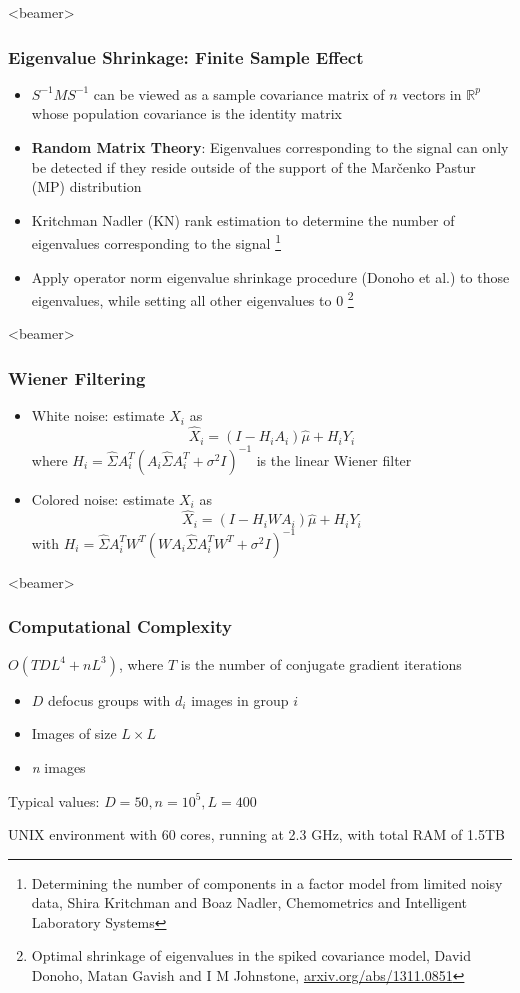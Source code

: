 \documentclass{beamer}
\begin{document}
\begin{frame}<beamer>
\frametitle{Eigenvalue Shrinkage:  Finite Sample Effect}
\begin{itemize}
\item $S^{-1}MS^{-1}$ can be viewed as a sample covariance matrix of
$n$ vectors in $ \mathbb{R}^p$ whose population covariance is the identity matrix
\item \textbf{Random Matrix Theory}: Eigenvalues corresponding to the signal 
can only be detected if they reside outside of the support of the  Mar\v{c}enko Pastur (MP)
distribution
\item Kritchman Nadler (KN) rank estimation to determine the number of eigenvalues 
corresponding to the signal \footnote{\tiny{Determining the number of components in a factor model from limited noisy data, Shira Kritchman and Boaz Nadler,
Chemometrics and Intelligent Laboratory Systems}}
\item Apply operator norm eigenvalue 
shrinkage procedure (Donoho et al.) to those eigenvalues, while setting all other eigenvalues to 
$0$ \footnote{\tiny{Optimal shrinkage of eigenvalues in the spiked covariance model,  David Donoho, Matan Gavish and I M Johnstone,
\url{arxiv.org/abs/1311.0851}}}
\end{itemize}

\end{frame}


\begin{frame}<beamer>
\frametitle{Wiener Filtering}

\begin{itemize}
\item White noise: estimate $X_i$ as
\begin{equation}
\hat X_i = (I-H_iA_{i})\hat\mu + H_iY_i 
\end{equation}
where $H_i = \hat \Sigma A_{i}^T ( A_{i} \hat \Sigma A_{i}^T + \sigma^2 
I)^{-1} $ is the linear Wiener filter  
\item Colored noise: estimate $X_i$ as
\begin{equation}
\hat X_i = (I-H_iWA_{i})\hat\mu + H_iY_i 
\end{equation}
with $H_i = \hat \Sigma A_{i}^T W^T (W A_{i} \hat \Sigma A_{i}^T W^T 
+ \sigma^2 I)^{-1}$
\end{itemize}
\end{frame}

\begin{frame}<beamer>
\frametitle{Computational Complexity}
$O(TDL^4 + nL^3)$, where $T$ is the number of conjugate gradient iterations
\begin{itemize}
\item $D$ defocus groups with $d_i$ images in group $i$
\item Images of size $L \times L$
\item \textit{n} images
\end{itemize}
Typical values: $D=50, n=10^5, L=400$

UNIX environment with 60 cores,
running at 2.3 GHz, with total RAM of 1.5TB
\end{frame}
\end{document}
